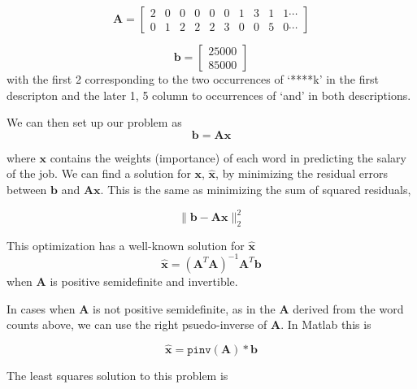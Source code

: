 \documentclass[12pt]{article}
\begin{document}
    \begin{equation*}
        \bm{A} = 
        \begin{bmatrix}
           2 & 0 & 0 & 0 & 0 & 0 & 1 & 3 & 1 & 1\cdots\\
	0 & 1 & 2 & 2 & 2 & 3 & 0 & 0 & 5 & 0\cdots
        \end{bmatrix}
    \end{equation*}
	
    \begin{equation*}
        \bm{b} = 
        \begin{bmatrix}
        25000\\
        85000
        \end{bmatrix}
    \end{equation*}
    with the first 2 corresponding to the two occurrences of `****k' in the first descripton and the later 1, 5 column to occurrences of `and' in both descriptions.


    We can then set up our problem as 
    \begin{equation}\label{eq:linsolve}
        \bm{b} = \bm{Ax}
    \end{equation}

    \noindent where $\bm{x}$ contains the weights (importance) of each word in
    predicting the salary of the job. We can find a solution for $\bm{x}$,
    $\bm{\hat{x}}$, by minimizing the residual errors between $\bm{b}$ and
    $\bm{Ax}$.  This is the same as minimizing the sum of squared residuals,

    \begin{equation}
        \|\bm{b} - \bm{Ax}\|^2_2
    \end{equation}

    \noindent This optimization has a well-known solution for $\bm{\hat{x}}$
    \begin{equation}
        \bm{\hat{x}} = (\bm{A}^{T}\bm{A})^{-1}\bm{A}^T\bm{b}
    \end{equation}
    when $\bm{A}$ is positive semidefinite and invertible.
    
    In cases when $\bm{A}$ is not positive semidefinite, as in the $\bm{A}$
    derived from the word counts above, we can use the right psuedo-inverse of
    $\bm{A}$.  In Matlab this is 
    
    \begin{equation} 
        \bm{\hat{x}} = \texttt{pinv}(\bm{A})*\bm{b}
    \end{equation}

    The least squares solution to this problem is
\end{document}
